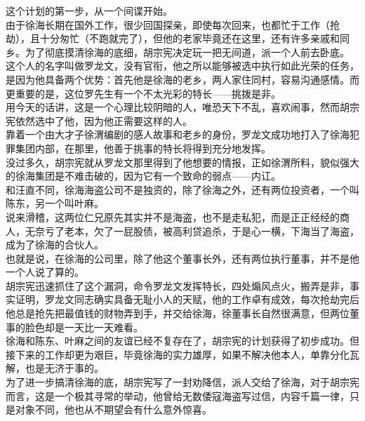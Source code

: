 \begin{multicols}{\theparacolNo}
这个计划的第一步，从一个间谍开始。\\

由于徐海长期在国外工作，很少回国探亲，即使每次回来，也都忙于工作（抢劫），且十分匆忙（不跑就完了），但他的老家毕竟还在这里，还有许多亲戚和同乡。为了彻底摸清徐海的底细，胡宗宪决定玩一把无间道，派一个人前去卧底。\\

这个人的名字叫做罗龙文，没有官衔，他之所以能够被选中执行如此光荣的任务，是因为他具备两个优势：首先他是徐海的老乡，两人家住同村，容易沟通感情。而更重要的是，这位罗先生有一个不太光彩的特长——挑拨是非。\\

用今天的话讲，这是一个心理比较阴暗的人，唯恐天下不乱，喜欢闹事，然而胡宗宪依然选中了他，因为他正需要这样的人。\\

靠着一个由大才子徐渭编剧的感人故事和老乡的身份，罗龙文成功地打入了徐海犯罪集团内部，在那里，他善于挑事的特长将得到充分地发挥。\\

没过多久，胡宗宪就从罗龙文那里得到了他想要的情报，正如徐渭所料，貌似强大的徐海集团是不难击破的，因为它有一个致命的弱点——内讧。\\

和汪直不同，徐海海盗公司不是独资的，除了徐海之外，还有两位投资者，一个叫陈东，另一个叫叶麻。\\

说来滑稽，这两位仁兄原先其实并不是海盗，也不是走私犯，而是正正经经的商人，无奈亏了老本，欠了一屁股债，被高利贷追杀，于是心一横，下海当了海盗，成为了徐海的合伙人。\\

也就是说，在徐海的公司里，除了他这个董事长外，还有两位执行董事，并不是他一个人说了算的。\\

胡宗宪迅速抓住了这个漏洞，命令罗龙文发挥特长，四处煽风点火，搬弄是非，事实证明，罗龙文同志确实具备无耻小人的天赋，他的工作卓有成效，每次抢劫完后他总是抢先把最值钱的财物弄到手，并交给徐海，徐董事长自然很满意，但两位董事的脸色却是一天比一天难看。\\

徐海和陈东、叶麻之间的友谊已经不复存在了，胡宗宪的计划获得了初步成功。但接下来的工作却更为艰巨，毕竟徐海的实力雄厚，如果不解决他本人，单靠分化瓦解，也是无济于事的。\\

为了进一步搞清徐海的底，胡宗宪写了一封劝降信，派人交给了徐海，对于胡宗宪而言，这是一个极其寻常的举动，他曾给无数倭寇海盗写过信，内容千篇一律，只是对象不同，他也从不期望会有什么意外惊喜。\\


\end{multicols}
